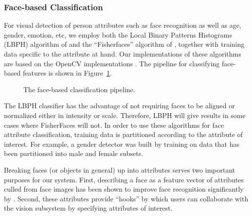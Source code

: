 \documentclass{llncs}
\begin{document}
\subsubsection{Face-based Classification}
For visual detection of person attributes such as face recognition as well as age, gender, emotion, etc, we employ both the Local Binary Patterns Histograms (LBPH) algorithm
of \citet{lbph} and the ``Fisherfaces'' algorithm of \citet{fisherfaces}, together with training data specific to the attribute at hand. Our implementations of these algorithms are based
on the OpenCV implementations \citep{opencv}. The pipeline for classifying face-based features is shown in
Figure~\ref{fig:face_classifiers}.
\begin{figure}[t]
\caption{The face-based classification pipeline.}
\label{fig:face_classifiers}
\end{figure}
The LBPH classifier has the advantage of not requiring faces to be
aligned or normalized either in intensity or scale. Therefore, LBPH
will give results in some cases where FisherFaces will not. In order
to use these algorithms for face attribute classification, training
data is partitioned according to the attribute of interest. For
example, a gender detector was built by training on data that has been
partitioned into male and female subsets.

Breaking faces (or objects in general) up into attributes serves two
important purposes for our system. First, describing a face as a
feature vector of attributes culled from face images has been shown to
improve face recognition significantly by
\citet{Kumar09attributeand}. Second, these attributes provide
``hooks'' by which users can collaborate with the vision subsystem by
specifying attributes of interest.
\end{document}
